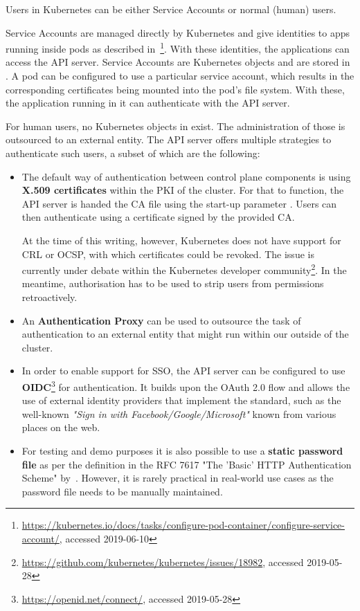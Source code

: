 Users in Kubernetes can be either Service Accounts or normal (human) users. 

Service Accounts are managed directly by Kubernetes and give identities to apps running inside pods as described in~\textcite{k8sdocs}\footnote{\url{https://kubernetes.io/docs/tasks/configure-pod-container/configure-service-account/}, accessed 2019-06-10}. With these identities, the applications can access the API server. Service Accounts are Kubernetes objects and are stored in . A pod can be configured to use a particular service account, which results in the corresponding certificates being mounted into the pod's file system. With these, the application running in it can authenticate with the API server. 

For human users, no Kubernetes objects in  exist. The administration of those is outsourced to an external entity. The API server offers multiple strategies to authenticate such users, a subset of which are the following:

\begin{itemize}
    \item The default way of authentication between control plane components is using \textbf{X.509 certificates} within the \ac{PKI} of the cluster. For that to function, the API server is handed the \ac{CA} file using the start-up parameter . Users can then authenticate using a certificate signed by the provided CA. 
    
    At the time of this writing, however, Kubernetes does not have support for \ac{CRL} or \ac{OCSP}, with which certificates could be revoked. The issue is currently under debate within the Kubernetes developer community\footnote{\url{https://github.com/kubernetes/kubernetes/issues/18982}, accessed 2019-05-28}. In the meantime, authorisation has to be used to strip users from permissions retroactively.

    \item An \textbf{Authentication Proxy} can be used to outsource the task of authentication to an external entity that might run within our outside of the cluster.
    
    \item In order to enable support for \ac{SSO}, the API server can be configured to use \textbf{\ac{OIDC}}\footnote{\url{https://openid.net/connect/}, accessed 2019-05-28} for authentication. It builds upon the OAuth 2.0 flow and allows the use of external identity providers that implement the standard, such as the well-known \textit{"Sign in with Facebook/Google/Microsoft"} known from various places on the web. 

   \item For testing and demo purposes it is also possible to use a \textbf{static password file} as per the definition in the RFC 7617 "The 'Basic' HTTP Authentication Scheme" by~\textcite{RFC7617}. However, it is rarely practical in real-world use cases as the password file needs to be manually maintained.
	
\end{itemize}

